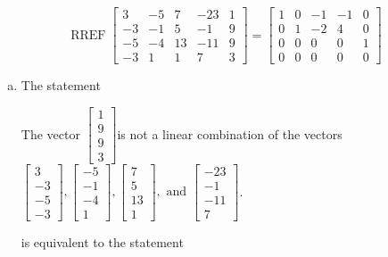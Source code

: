 \begin{exerciseAnswer} 
\[\operatorname{RREF}  \left[\begin{array}{cccc|c}
3 & -5 & 7 & -23 & 1 \\
-3 & -1 & 5 & -1 & 9 \\
-5 & -4 & 13 & -11 & 9 \\
-3 & 1 & 1 & 7 & 3
\end{array}\right] = \left[\begin{array}{cccc|c}
1 & 0 & -1 & -1 & 0 \\
0 & 1 & -2 & 4 & 0 \\
0 & 0 & 0 & 0 & 1 \\
0 & 0 & 0 & 0 & 0
\end{array}\right] \]
\begin{enumerate}[(a)]
\item  The statement 
\begin{center}\begin{minipage}{0.8\textwidth}
 The vector \( \left[\begin{array}{c}
1 \\
9 \\
9 \\
3
\end{array}\right] \)is not a linear combination of the vectors \( \left[\begin{array}{c}
3 \\
-3 \\
-5 \\
-3
\end{array}\right] , \left[\begin{array}{c}
-5 \\
-1 \\
-4 \\
1
\end{array}\right] , \left[\begin{array}{c}
7 \\
5 \\
13 \\
1
\end{array}\right] , \text{ and } \left[\begin{array}{c}
-23 \\
-1 \\
-11 \\
7
\end{array}\right] \). 
\end{minipage}\end{center}
     is equivalent to the statement 
\begin{center}\begin{minipage}{0.8\textwidth}

\end{minipage}
\end{center}
\end{enumerate}
\end{exerciseAnswer}

